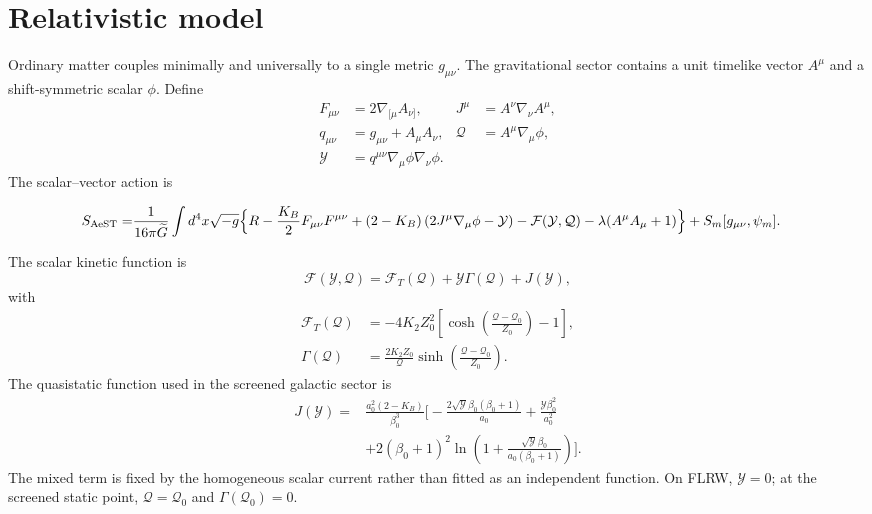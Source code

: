 \documentclass[aps,prd,twocolumn,superscriptaddress,nofootinbib,longbibliography,floatfix]{revtex4-2}
\newcommand{\Y}{\mathcal{Y}}
\newcommand{\Q}{\mathcal{Q}}
\newcommand{\FT}{\mathcal{F}_{T}}
\newcommand{\Ffull}{\mathcal{F}}
\begin{document}
\section{Relativistic model}\label{sec:theory}
Ordinary matter couples minimally and universally to a single metric $g_{\mu\nu}$. The gravitational sector contains a unit timelike vector $A^\mu$ and a shift-symmetric scalar $\phi$. Define
\begin{align}
F_{\mu\nu}&=2\nabla_{[\mu}A_{\nu]}, &
J^\mu&=A^\nu\nabla_\nu A^\mu,\\
q_{\mu\nu}&=g_{\mu\nu}+A_\mu A_\nu, &
\Q&=A^\mu\nabla_\mu\phi,\\
\Y&=q^{\mu\nu}\nabla_\mu\phi\nabla_\nu\phi.
\end{align}
The scalar--vector action is
\begin{widetext}
\begin{align}
S_{\rm AeST}=&\frac{1}{16\pi\widetilde G}\int d^4x\sqrt{-g}\Big\{R-\frac{K_B}{2}F_{\mu\nu}F^{\mu\nu}
 +(2-K_B)\left(2J^\mu\nabla_\mu\phi-\Y\right)
-\Ffull(\Y,\Q)-\lambda(A^\mu A_\mu+1)\Big\}
+S_m[g_{\mu\nu},\psi_m].
\label{eq:aest-action}
\end{align}
\end{widetext}
The scalar kinetic function is
\begin{equation}
\Ffull(\Y,\Q)=\FT(\Q)+\Y\Gamma(\Q)+J(\Y),
\label{eq:fullF}
\end{equation}
with
\begin{align}
\FT(\Q)&=-4K_2Z_0^2\left[\cosh\left(\frac{\Q-\Q_0}{Z_0}\right)-1\right],\label{eq:FT}\\
\Gamma(\Q)&=\frac{2K_2Z_0}{\Q}\sinh\left(\frac{\Q-\Q_0}{Z_0}\right).\label{eq:Gamma}
\end{align}
The quasistatic function used in the screened galactic sector is
\begin{align}
J(\Y)=&\frac{a_0^2(2-K_B)}{\beta_0^3}\Bigg[-\frac{2\sqrt{\Y}\beta_0(\beta_0+1)}{a_0}
+\frac{\Y\beta_0^2}{a_0^2}\nonumber\\
&+2(\beta_0+1)^2\ln\left(1+\frac{\sqrt{\Y}\beta_0}{a_0(\beta_0+1)}\right)\Bigg].
\label{eq:JY}
\end{align}
The mixed term is fixed by the homogeneous scalar current rather than fitted as an independent function. On FLRW, $\Y=0$; at the screened static point, $\Q=\Q_0$ and $\Gamma(\Q_0)=0$.
\end{document}
